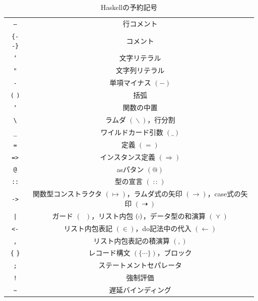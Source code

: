 \documentclass[a4paper,twocolumn]{jsbook}
\newcommand{\programminglanguage}[1]{\textsf{#1}}
\newcommand{\haskell}{\programminglanguage{Haskell}}
\newcommand{\code}[1]{\texttt{#1}}
\DeclareMathOperator{\mSuperClass}{\Rightarrow}
\newcommand{\mAnyParam}{\_}
\DeclareMathOperator{\mDoEq}{\leftarrow}
\DeclareMathOperator{\mFrom}{\in}
\DeclareMathOperator{\mIfSo}{\dashrightarrow}
\DeclareMathOperator{\mIn}{{:\!:}}
\DeclareMathOperator{\mLambda}{\backslash}
\DeclareMathOperator{\mValueOr}{\curlyvee}
\newcommand{\mGuard}[1]{\mathop{\mid_{#1}}}
\newcommand{\mListComp}[1]{\shortmid#1}
\begin{document}
\begin{table}
\caption{\haskell の予約記号}
\label{tab:reserved-symbols}
\begin{center}
\begin{tabular}{||c|c||}
\hline
\code{--}&行コメント\\
\code{\{-} \code{-\}}&コメント\\
\hline
\code{'}&文字リテラル\\
\code{"}&文字列リテラル\\%
\hline
\code{-}&単項マイナス $(-)$\\
\code{(} \code{)}&括弧\\
\code{`}&関数の中置\\
\hline
\code{\textbackslash}&ラムダ $(\mLambda)$，行分割\\
\code{\_}&ワイルドカード引数 $(\mAnyParam)$\\
\code{=}&定義 $(=)$\\
\code{=>}&インスタンス定義 $(\mSuperClass)$\\
\code{@}&asパタン $(@)$\\
\hline
\code{::}&型の宣言 $(\mIn)$\\
\code{->}&関数型コンストラクタ $(\mapsto)$，ラムダ式の矢印 $(\rightarrow)$，case式の矢印 $(\mIfSo)$\\
\hline
\code{|}&ガード $(\mGuard{})$，リスト内包 $(\mListComp)$，データ型の和演算 $(\mValueOr)$\\
\code{<-}&リスト内包表記 $(\mFrom)$，do記法中の代入 $(\mDoEq)$\\
\code{,}&リスト内包表記の積演算 $(,)$\\
\hline
\code{\{} \code{\}}&レコード構文 $(\{\dotsb\})$，ブロック\\
\code{;}&ステートメントセパレータ\\
\hline
\code{!}&強制評価\\
\code{\textasciitilde}&遅延バインディング\\
\hline
\end{tabular}
\end{center}
\end{table}
\end{document}
